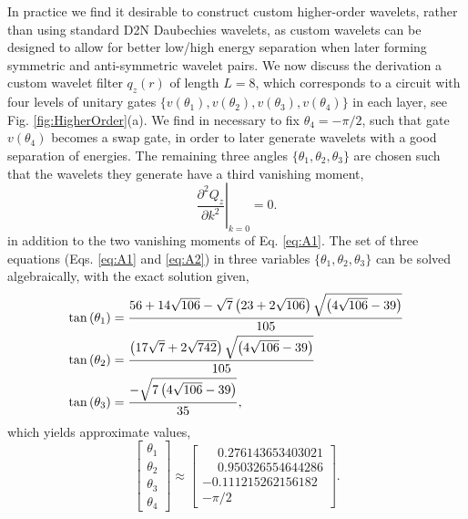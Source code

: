\documentclass[aps,prl,twocolumn,showpacs,superscriptaddress,floatfix,10pt]{revtex4-1}
\begin{document}
In practice we find it desirable to construct custom higher-order wavelets,
rather than using standard D2N Daubechies wavelets, as custom wavelets can be designed
to allow for better low/high energy separation when later forming symmetric and
anti-symmetric wavelet pairs. We now discuss the derivation a custom wavelet
filter $q_z(r)$ of length $L=8$, which corresponds to a circuit with four
levels of unitary gates 
$\{v(\theta_1), v(\theta_2), v(\theta_3), v(\theta_4)\}$ 
in each layer, see Fig. \ref{fig:HigherOrder}(a). We find in
necessary to fix $\theta_4=-\pi/2$, such that gate $v(\theta_4)$ becomes a swap
gate, in order to later generate wavelets with a good separation of energies.
The remaining three angles $\{\theta_1, \theta_2, \theta_3 \}$ are chosen such
that the wavelets they generate have a third vanishing moment, 
\begin{equation}
{\left. {\frac{{{\partial^2 }{Q_z}}}{{\partial {k }^2}}} \right|_{k  = 0}} = 0.  \label{eq:A2}
\end{equation}
 in addition to the two vanishing moments of Eq. \ref{eq:A1}. The set of three
equations (Eqs. \ref{eq:A1} and \ref{eq:A2}) in three variables 
$\{\theta_1, \theta_2, \theta_3 \}$ can be solved algebraically, with the exact solution
given,
 \begin{align}
  \tan \left( {{\theta _1}} \right) &= \frac{{56 + 14\sqrt {106}  - \sqrt 7 \left( {23 + 2\sqrt {106} } \right)\sqrt {\left( {4\sqrt {106}  - 39} \right)} }}{{105}} \hfill \nonumber \\
  \tan \left( {{\theta _2}} \right) &= \frac{{\left( {17\sqrt 7  + 2\sqrt {742} } \right)\sqrt {\left( {4\sqrt {106}  - 39} \right)} }}{{105}} \hfill\nonumber \\
  \tan \left( {{\theta _3}} \right) &= \frac{{ - \sqrt {7\left( {4\sqrt {106}  - 39} \right)} }}{{35}} \hfill, \label{eq:A3}
\end{align}  
which yields approximate values,
\begin{equation}
\left[ {\begin{array}{*{20}{c}}
  {{\theta _1}} \\ 
  {{\theta _2}} \\ 
  {{\theta _3}} \\ 
  {{\theta _4}} 
\end{array}} \right] \approx \left[ {\begin{array}{*{20}{c}}
  {\phantom{-}0.276143653403021} \\ 
  {\phantom{-}0.950326554644286} \\ 
  { - 0.111215262156182} \\ 
  { - \pi /2} 
\end{array}} \right]. \label{eq:A4}
\end{equation}
\end{document}
